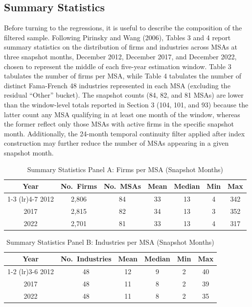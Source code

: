 \documentclass[
  12pt,
]{article}
\begin{document}
\subsection{Summary Statistics}\label{summary-statistics}

Before turning to the regressions, it is useful to describe the
composition of the filtered sample. Following Pirinsky and Wang (2006),
Tables 3 and 4 report summary statistics on the distribution of firms
and industries across MSAs at three snapshot months, December 2012,
December 2017, and December 2022, chosen to represent the middle of each
five-year estimation window. Table 3 tabulates the number of firms per
MSA, while Table 4 tabulates the number of distinct Fama-French 48
industries represented in each MSA (excluding the residual ``Other''
bucket). The snapshot counts (84, 82, and 81 MSAs) are lower than the
window-level totals reported in Section 3 (104, 101, and 93) because the
latter count any MSA qualifying in at least one month of the window,
whereas the former reflect only those MSAs with active firms in the
specific snapshot month. Additionally, the 24-month temporal continuity
filter applied after index construction may further reduce the number of
MSAs appearing in a given snapshot month.

\begin{table}[!h]
\centering
\caption{Summary Statistics Panel A: Firms per MSA (Snapshot Months)}
\fontsize{10}{12}\selectfont
\begin{tabular}{ccccccc}
\toprule
Year & No.\ Firms & No.\ MSAs & Mean & Median & Min & Max \\
\cmidrule(lr){1-3} \cmidrule(lr){4-7}
2012 & 2,806 & 84 & 33 & 13 & 4 & 342 \\
2017 & 2,815 & 82 & 34 & 13 & 3 & 352 \\
2022 & 2,701 & 81 & 33 & 13 & 4 & 317 \\
\bottomrule
\end{tabular}
\end{table}

\begin{table}[!h]
\centering
\caption{Summary Statistics Panel B: Industries per MSA (Snapshot Months)}
\fontsize{10}{12}\selectfont
\begin{tabular}{cccccc}
\toprule
Year & No.\ Industries & Mean & Median & Min & Max \\
\cmidrule(lr){1-2} \cmidrule(lr){3-6}
2012 & 48 & 12 & 9 & 2 & 40 \\
2017 & 48 & 11 & 8 & 2 & 39 \\
2022 & 48 & 11 & 8 & 2 & 35 \\
\bottomrule
\end{tabular}
\end{table}
\end{document}
